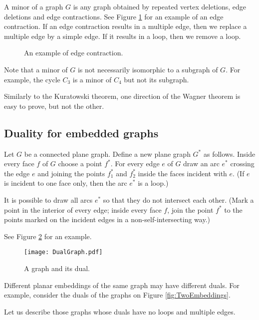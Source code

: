 \begin{page}
\setcounter{section}{3}
\setcounter{subsection}{4}
\setcounter{dfn}{11}
\label{portion:310}


A minor of a graph $G$ is any graph obtained by repeated vertex deletions, edge deletions and edge contractions.
See Figure \ref{fig:K5Contraction} for an example of an edge contraction.
If an edge contraction results in a multiple edge, then we replace a multiple edge by a simple edge.
If it results in a loop, then we remove a loop.

\begin{figure}[ht]
\begin{center}

\end{center}
\caption{An example of edge contraction.}
\label{fig:K5Contraction}
\end{figure}

Note that a minor of $G$ is not necessarily isomorphic to a subgraph of $G$.
For example, the cycle $C_3$ is a minor of $C_4$ but not its subgraph.

Similarly to the Kuratowski theorem, one direction of the Wagner theorem is easy to prove, but not the other.




\end{page}

\begin{page}
\setcounter{section}{3}
\setcounter{subsection}{4}
\setcounter{dfn}{11}
\label{portion:311}

\subsection{Duality for embedded graphs}
Let $G$ be a connected plane graph.
Define a new plane graph $G^*$ as follows.
Inside every face $f$ of $G$ choose a point $f^*$.
For every edge $e$ of $G$ draw an arc $e^*$ crossing the edge $e$ and joining the points $f_1^*$ and $f_2^*$ inside the faces incident with $e$.
(If $e$ is incident to one face only, then the arc $e^*$ is a loop.)

It is possible to draw all arcs $e^*$ so that they do not intersect each other.
(Mark a point in the interior of every edge;
inside every face $f$, join the point $f^*$ to the points marked on the incident edges in a non-self-intersecting way.)

See Figure \ref{fig:DualGraph} for an example.

\begin{figure}[ht]
\begin{center}
\texttt{[image: DualGraph.pdf]}
\end{center}
\caption{A graph and its dual.}
\label{fig:DualGraph}
\end{figure}

Different planar embeddings of the same graph may have different duals.
For example, consider the duals of the graphs on Figure \ref{fig:TwoEmbeddings}.

Let us describe those graphs whose duals have no loops and multiple edges.


\end{page}

